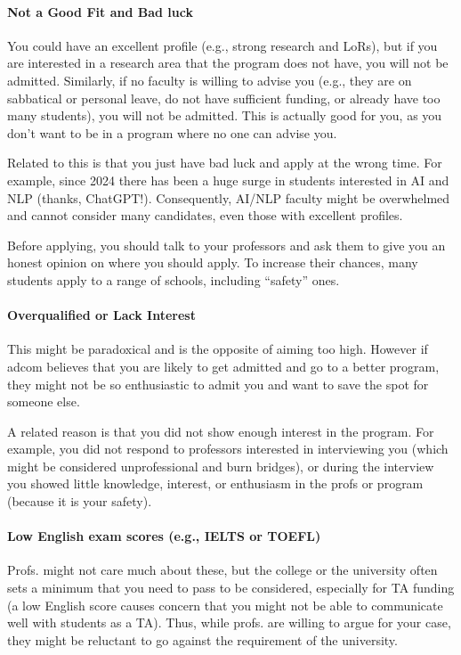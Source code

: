 \documentclass[oneside,11pt,dvipsnames]{book}
\begin{document}
\paragraph{Not a Good Fit and Bad luck}  You could have an excellent profile (e.g., strong research and LoRs), but if you are interested in a research area that the program does not have, you will not be admitted.
Similarly, if no faculty is willing to advise you (e.g., they are on sabbatical or personal leave, do not have sufficient funding, or already have too many students), you will not be admitted.  This is actually good for you, as you don't want to be in a program where no one can advise you.

Related to this is that you just have bad luck and apply at the wrong time.  For example, since 2024 there has been a huge surge in students interested in AI and NLP (thanks, ChatGPT!). Consequently, AI/NLP faculty might be overwhelmed and cannot consider many candidates, even those with excellent profiles.



Before applying, you should talk to your professors and ask them to give you an honest opinion on where you should apply. To increase their chances, many students apply to a range of schools, including ``safety'' ones. 


\paragraph{Overqualified or Lack Interest}  This might be paradoxical and is the opposite of aiming too high. However if adcom believes that you are likely to get admitted and go to a better program, they might not be so enthusiastic to admit you and want to save the spot for someone else.

A related reason is that you did not show enough interest in the program.
For example, you did not respond to professors interested in interviewing you (which might be considered unprofessional and burn bridges), or during the interview you showed little knowledge, interest, or enthusiasm in the profs or program (because it is your safety). 

\paragraph{Low English exam scores (e.g., IELTS or TOEFL)}  Profs. might not care much about these, but the college or the university often sets a minimum that you need to pass to be considered, especially for TA funding (a low English score causes concern that you might not be able to communicate well with students as a TA).  Thus, while profs. are willing to argue for your case, they might be reluctant to go against the requirement of the university.
\end{document}
